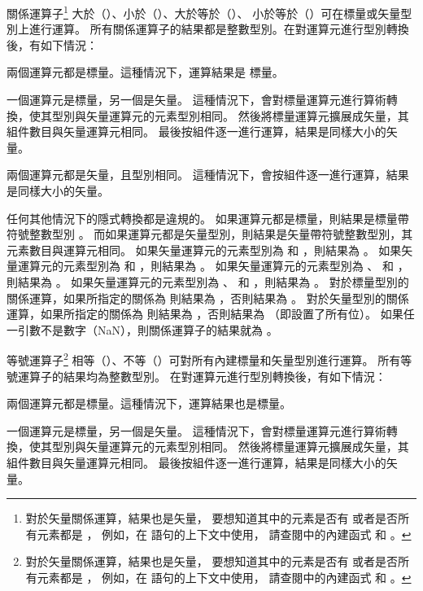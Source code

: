 {%
\startitem
關係運算子\footnote{
對於矢量關係運算，結果也是矢量，
要想知道其中的元素是否有  或者是否所有元素都是 ，
例如，在  語句的上下文中使用，
請查閱中的內建函式  和 。}
大於（\ccmm{>}）、小於（\ccmm{<}）、大於等於（\ccmm{>=}）、
小於等於（\ccmm{<=}）可在標量或矢量型別上進行運算。
所有關係運算子的結果都是整數型別。在對運算元進行型別轉換後，有如下情況：
\startigBig
\item 兩個運算元都是標量。這種情況下，運算結果是  標量。

\item 一個運算元是標量，另一個是矢量。
這種情況下，會對標量運算元進行算術轉換，使其型別與矢量運算元的元素型別相同。
然後將標量運算元擴展成矢量，其組件數目與矢量運算元相同。
最後按組件逐一進行運算，結果是同樣大小的矢量。

\item 兩個運算元都是矢量，且型別相同。
這種情況下，會按組件逐一進行運算，結果是同樣大小的矢量。
\stopigBig

任何其他情況下的隱式轉換都是違規的。
如果運算元都是標量，則結果是標量帶符號整數型別 。
而如果運算元都是矢量型別，則結果是矢量帶符號整數型別，其元素數目與運算元相同。
如果矢量運算元的元素型別為  和 ，則結果為 。
如果矢量運算元的元素型別為  和 ，則結果為 。
如果矢量運算元的元素型別為 、  和 ，則結果為 。
如果矢量運算元的元素型別為 、  和 ，則結果為 。
對於標量型別的關係運算，如果所指定的關係為  則結果為 ，否則結果為 。
對於矢量型別的關係運算，如果所指定的關係為  則結果為 ，否則結果為  （即設置了所有位）。
如果任一引數不是數字（NaN），則關係運算子的結果就為 。
\stopitem

\startitem
等號運算子\footnote{
對於矢量關係運算，結果也是矢量，
要想知道其中的元素是否有  或者是否所有元素都是 ，
例如，在  語句的上下文中使用，
請查閱中的內建函式  和 。}
相等（\ccmm{==}）、不等（\ccmm{!=}）可對所有內建標量和矢量型別進行運算。
所有等號運算子的結果均為整數型別。
在對運算元進行型別轉換後，有如下情況：
\startigBig
\item 兩個運算元都是標量。這種情況下，運算結果也是標量。

\item 一個運算元是標量，另一個是矢量。
這種情況下，會對標量運算元進行算術轉換，使其型別與矢量運算元的元素型別相同。
然後將標量運算元擴展成矢量，其組件數目與矢量運算元相同。
最後按組件逐一進行運算，結果是同樣大小的矢量。

}
